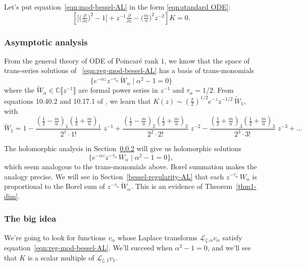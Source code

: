 \documentclass{article}
\theoremstyle{definition}
\newcommand{\C}{\mathbb{C}}
\newcommand{\series}[1]{\tilde{#1}}
\newcommand{\laplace}{\mathcal{L}}
\begin{document}
Let's put equation~\eqref{eqn:mod-bessel-AL} in the form \eqref{eqn:standard ODE}:
\begin{equation}\label{eqn:reg-mod-bessel-AL}
\left[ \big[ \big(\tfrac{\partial}{\partial z}\big)^2 - 1 \big] + z^{-1} \tfrac{\partial}{\partial z} - \big({\tfrac{m}{n}}\big)^2 z^{-2} \right] K = 0.
\end{equation}

\subsubsection{Asymptotic analysis}\label{sec:asympt-AL}

From the general theory of ODE of Poincar\'e rank $1$, we know that the space of trans-series solutions of ~\eqref{eqn:reg-mod-bessel-AL} has a basis of trans-monomials
\[ \{ e^{-\alpha z} z^{-\tau_\alpha}\,\series{W}_\alpha \mid \alpha^2 - 1 = 0 \} \]
where the $\series{W}_\alpha\in\C\llbracket z^{-1} \rrbracket$ are formal power series in $z^{-1}$ and $\tau_\alpha=1/2$. From equations 10.40.2 and 10.17.1 of \cite{dlmf}, we learn that $K(z) \sim \left(\tfrac{\pi}{2}\right)^{1/2} e^{-z} z^{-1/2}\,\series{W}_1$, with
\begin{equation}\label{bessel-asymp-AL}
\series{W}_1 = 1 - \frac{(\tfrac{1}{2}-\tfrac{m}{n})_1 (\tfrac{1}{2}+\frac{m}{n})_1}{2^1 \cdot 1!}\;z^{-1} + \frac{(\tfrac{1}{2}-\tfrac{m}{n})_2 (\tfrac{1}{2}+\tfrac{m}{n})_2}{2^2 \cdot 2!}\;z^{-2} - \frac{(\tfrac{1}{2}+\tfrac{m}{n})_3 (\tfrac{1}{2}+\tfrac{m}{n})_3}{2^3 \cdot 3!}\;z^{-3} + \ldots
\end{equation}

The holomorphic analysis in Section~\ref{big-idea} will give us holomorphic solutions
\[ \{ e^{-\alpha z} z^{-\tau_\alpha}\,W_\alpha \mid \alpha^2 - 1 = 0 \}, \]
which seem analogous to the trans-monomials above. Borel summation makes the analogy precise. We will see in Section~\ref{bessel-regularity-AL} that each $z^{-\tau_\alpha}\,W_\alpha$ is proportional to the Borel sum of $z^{-\tau_\alpha}\,\series{W}_\alpha$. This is an evidence of Theorem~\ref{thm1-dim}.
\subsubsection{The big idea}\label{big-idea}
We're going to look for functions $v_\alpha$ whose Laplace transforms $\laplace_{\zeta, \alpha} v_\alpha$ satisfy equation~\eqref{eqn:reg-mod-bessel-AL}. We'll succeed when $\alpha^2 - 1 = 0$, and we'll see that $K$ is a scalar multiple of $\laplace_{\zeta, 1} v_1$.
\end{document}
